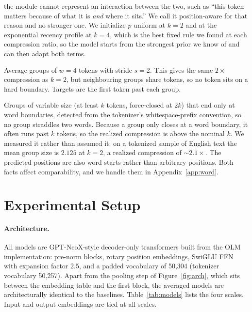 \documentclass[11pt]{article}
\begin{document}
\begin{description}
        the module cannot represent an interaction between the two, such as
        ``this token matters because of what it is \emph{and} where it sits.''
        We call it position-aware for that reason and no stronger one. We
        initialize $p$ uniform at $k{=}2$ and at the exponential recency
        profile at $k{=}4$, which is the best fixed rule we found at each
        compression ratio, so the model starts from the strongest prior we
        know of and can then adapt both terms.
  \item[Overlapping groups.] Average groups of $w{=}4$ tokens with stride
        $s{=}2$. This gives the same $2\times$ compression as $k{=}2$, but
        neighbouring groups share tokens, so no token sits on a hard boundary.
        Targets are the first token past each group.
  \item[Word-aligned groups.] Groups of variable size (at least $k$ tokens,
        force-closed at $2k$) that end only at word boundaries, detected from
        the tokenizer's whitespace-prefix convention, so no group straddles two
        words. Because a group only closes at a word boundary, it often runs
        past $k$ tokens, so the realized compression is above the nominal
        $k$. We measured it rather than assumed it: on a tokenized sample of
        English text the mean group size is $2.125$ at $k{=}2$, a realized
        compression of ${\sim}2.1\times$. The predicted positions are also
        word starts rather than arbitrary positions. Both facts affect
        comparability, and we handle them in Appendix~\ref{app:word}.
\end{description}

\section{Experimental Setup}
\label{sec:setup}

\paragraph{Architecture.}
All models are GPT-NeoX-style decoder-only transformers built from the OLM
implementation: pre-norm blocks, rotary position embeddings, SwiGLU FFN with
expansion factor 2.5, and a padded vocabulary of 50{,}304 (tokenizer
vocabulary 50{,}257). Apart from the pooling step of
Figure~\ref{fig:arch}, which sits between the embedding table and the first
block, the averaged models are architecturally identical to the baselines.
Table~\ref{tab:models} lists the four scales. Input and output embeddings are
tied at all scales.
\end{document}

